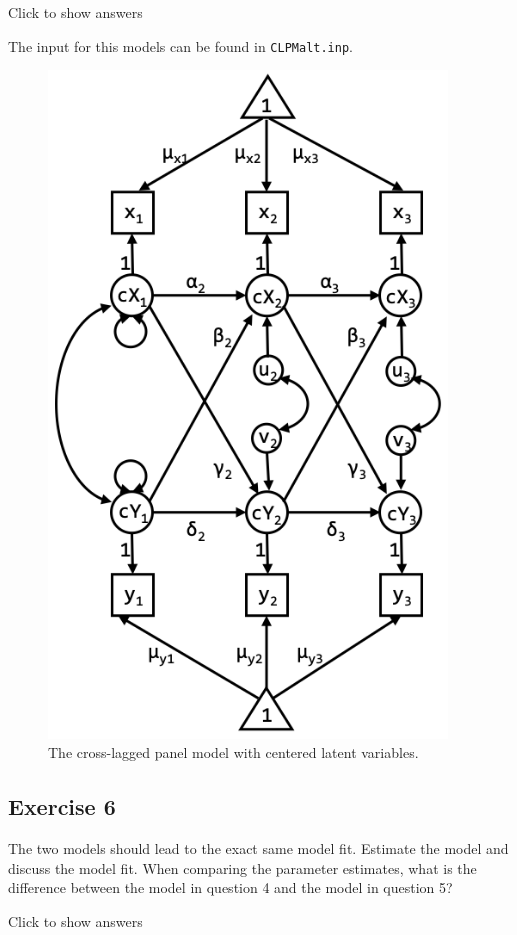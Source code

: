 \documentclass[
]{book}
\begin{document}
Click to show answers

The input for this models can be found in \texttt{CLPMalt.inp}.

\begin{figure}
\centering
\includegraphics[width=4.16667in,height=\textheight]{CLPM-centered.png}
\caption{The cross-lagged panel model with centered latent variables.}
\end{figure}

\hypertarget{exercise-6}{%
\subsection{Exercise 6}\label{exercise-6}}

The two models should lead to the exact same model fit. Estimate the model and discuss the model fit. When comparing the parameter estimates, what is the difference between the model in question 4 and the model in question 5?

Click to show answers
\end{document}
